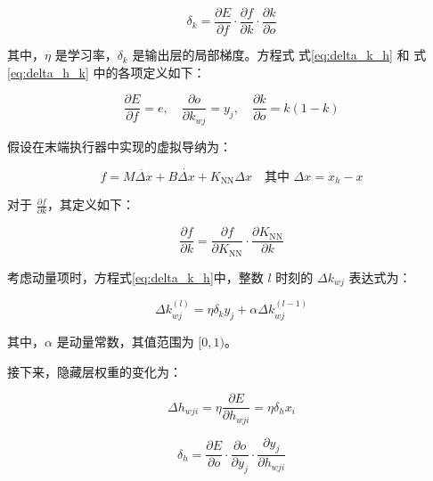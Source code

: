 \documentclass{Diploma}
\begin{document}
\begin{equation} \label{eq:delta_h_k}
\delta_k = \frac{\partial E}{\partial f} \cdot \frac{\partial f}{\partial k} \cdot \frac{\partial k}{\partial o}
\end{equation}

其中，$\eta$ 是学习率，$\delta_k$ 是输出层的局部梯度。方程式 式\eqref{eq:delta_k_h} 和 式\eqref{eq:delta_h_k} 中的各项定义如下：

\begin{equation} \label{eq:partial_derivatives}
\frac{\partial E}{\partial f} = e, \quad \frac{\partial o}{\partial k_{wj}} = y_j, \quad \frac{\partial k}{\partial o} = k(1 - k)
\end{equation}

假设在末端执行器中实现的虚拟导纳为：

\begin{equation} \label{eq:virtual_admittance}
f = M \ddot{\Delta x} + B \dot{\Delta x} + K_{\mathrm{NN}} \Delta x
\quad \text{其中 } \Delta x = x_h - x
\end{equation}

对于 $\frac{\partial f}{\partial k}$，其定义如下：

\begin{equation} \label{eq:partial_f_k}
\frac{\partial f}{\partial k} = \frac{\partial f}{\partial K_{\mathrm{NN}}} \cdot \frac{\partial K_{\mathrm{NN}}}{\partial k}
\end{equation}

考虑动量项时，方程式\eqref{eq:delta_k_h}中，整数 $l$ 时刻的 $\Delta k_{wj}$ 表达式为：

\begin{equation} \label{eq:delta_k_wj_l}
\Delta k_{wj}^{(l)} = \eta \delta_k y_j + \alpha \Delta k_{wj}^{(l-1)}
\end{equation}

其中，$\alpha$ 是动量常数，其值范围为 $[0, 1)$。

接下来，隐藏层权重的变化为：

\begin{equation} \label{eq:delta_h_wji}
\Delta h_{wji} = \eta \frac{\partial E}{\partial h_{wji}} = \eta \delta_h x_i
\end{equation}

\begin{equation} \label{eq:delta_h}
\delta_h = \frac{\partial E}{\partial o} \cdot \frac{\partial o}{\partial y_j} \cdot \frac{\partial y_j}{\partial h_{wji}}
\end{equation}
\end{document}
